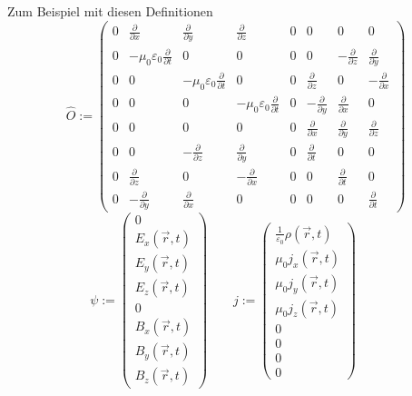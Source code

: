 \documentclass[12pt]{book}
\begin{document}
Zum Beispiel mit diesen Definitionen
\begin{equation*} 
\hat{O} := \begin{pmatrix} 
0 & \frac{\partial}{\partial x} & \frac{\partial}{\partial y} & \frac{\partial}{\partial z} & 0 & 0 & 0 & 0 \\ 
0 & -\mu _0\varepsilon _0\frac{\partial}{\partial t} & 0 & 0 & 0 & 0 & -\frac{\partial}{\partial z} & \frac{\partial}{\partial y} \\ 
0 & 0 & -\mu _0\varepsilon _0\frac{\partial}{\partial t} & 0 & 0 & \frac{\partial}{\partial z} & 0 & -\frac{\partial}{\partial x} \\ 
0 & 0 & 0 & -\mu _0\varepsilon _0\frac{\partial}{\partial t} & 0 & -\frac{\partial}{\partial y} & \frac{\partial}{\partial x} & 0 \\ 
0 & 0 & 0 & 0 & 0 & \frac{\partial}{\partial x} & \frac{\partial}{\partial y} & \frac{\partial}{\partial z} \\ 
0 & 0 & -\frac{\partial}{\partial z} & \frac{\partial}{\partial y} & 0 & \frac{\partial}{\partial t} & 0 & 0 \\ 
0 & \frac{\partial}{\partial z} & 0 & -\frac{\partial}{\partial x} & 0 & 0 & \frac{\partial}{\partial t} & 0 \\ 
0 & -\frac{\partial}{\partial y} & \frac{\partial}{\partial x} & 0 & 0 & 0 & 0 & \frac{\partial}{\partial t} 
\end{pmatrix} 
\end{equation*} 
\begin{equation*} 
\psi := \begin{pmatrix} 
0 \\ E_x(\vec{r},t) \\ E_y(\vec{r},t) \\ E_z(\vec{r},t)  \\ 0 \\ B_x(\vec{r},t) \\ B_y(\vec{r},t) \\ B_z(\vec{r},t) 
\end{pmatrix} \quad\quad 
j := \begin{pmatrix} 
\frac {1}{\varepsilon _0}\rho(\vec{r},t) \\ \mu _0 j_x(\vec{r},t) \\ \mu _0 j_y(\vec{r},t) \\ \mu _0 j_z(\vec{r},t) \\ 0 \\ 0 \\ 0 \\ 0 
\end{pmatrix} \quad\quad 
\end{equation*}
\end{document}
